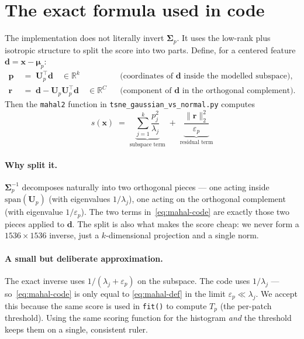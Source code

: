 \documentclass[11pt]{article}
\newcommand{\code}[1]{\texttt{#1}}
\newcommand{\Up}{\mathbf{U}_p}
\newcommand{\bmu}{\boldsymbol{\mu}}
\newcommand{\bSigma}{\boldsymbol{\Sigma}}
\newcommand{\R}{\mathbb{R}}
\newcommand{\resid}{\mathbf{r}}
\begin{document}
\section{The exact formula used in code}

The implementation does not literally invert $\bSigma_p$. It uses the low-rank
plus isotropic structure to split the score into two parts. Define, for a
centered feature $\mathbf{d} = \mathbf{x} - \bmu_p$:
\begin{align}
  \mathbf{p}    &\;=\; \Up^\top \mathbf{d}  \quad\in\R^{k}
    && \text{(coordinates of $\mathbf{d}$ inside the modelled subspace),} \\
  \resid &\;=\; \mathbf{d} - \Up\Up^\top \mathbf{d}  \quad\in\R^{C}
    && \text{(component of $\mathbf{d}$ in the orthogonal complement).}
\end{align}
Then the \code{mahal2} function in
\code{tsne\_gaussian\_vs\_normal.py} computes
\begin{equation}
  \boxed{\;
    s(\mathbf{x}) \;=\;
    \underbrace{\sum_{j=1}^{k}\frac{p_j^{2}}{\lambda_j}}_{\text{subspace term}}
    \;+\;
    \underbrace{\frac{\lVert \resid \rVert_2^{2}}{\varepsilon_p}}_{\text{residual term}}
  \;}
  \label{eq:mahal-code}
\end{equation}
\paragraph{Why split it.}
$\bSigma_p^{-1}$ decomposes naturally into two orthogonal pieces --- one acting
inside $\mathrm{span}(\Up)$ (with eigenvalues $1/\lambda_j$), one acting on the
orthogonal complement (with eigenvalue $1/\varepsilon_p$). The two terms
in~\eqref{eq:mahal-code} are exactly those two pieces applied to $\mathbf{d}$.
The split is also what makes the score cheap: we never form a $1536 \times 1536$
inverse, just a $k$-dimensional projection and a single norm.

\paragraph{A small but deliberate approximation.}
The exact inverse uses $1/(\lambda_j + \varepsilon_p)$ on the subspace. The code
uses $1/\lambda_j$ --- so~\eqref{eq:mahal-code} is only equal to
\eqref{eq:mahal-def} in the limit $\varepsilon_p \ll \lambda_j$. We accept this
because the same score is used in \code{fit()} to compute $T_p$ (the per-patch
threshold). Using the same scoring function for the histogram \emph{and} the
threshold keeps them on a single, consistent ruler.
\end{document}
